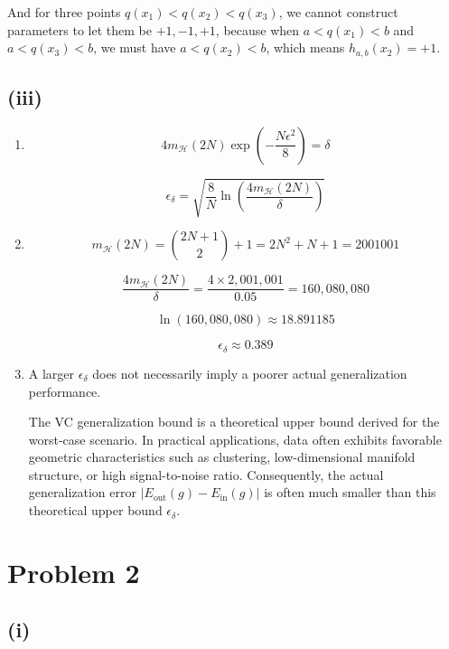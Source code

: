 \documentclass[11pt]{article}
\begin{document}
And for three points $q(x_1) < q(x_2) < q(x_3)$, we cannot construct parameters to let them be $+1, -1, +1$, because when $a < q(x_1) < b$ and $a < q(x_3) < b$, we must have $a < q(x_2) < b$, which means $h_{a,b}(x_2) = +1$.

\subsection*{(iii)}

\begin{enumerate}
    \item[1. ]
    
    $$
    4 m_\mathcal{H}(2N) \exp\left(-\frac{N\epsilon^2}{8}\right) = \delta
    $$

    $$
    \epsilon_\delta = \sqrt{\frac{8}{N} \ln\left(\frac{4 m_\mathcal{H}(2N)}{\delta}\right)}
    $$

    \item[2. ]
    
    $$
    m_\mathcal{H}(2N) = \binom{2N+1}{2} + 1 = 2N^2 + N + 1 = 2001001
    $$

    $$
    \frac{4 m_\mathcal{H}(2N)}{\delta} = \frac{4 \times 2,001,001}{0.05} = 160,080,080
    $$

    $$
    \ln(160,080,080) \approx 18.891185
    $$

    $$
    \epsilon_\delta \approx 0.389
    $$

    \item[3. ]
    
    A larger $\epsilon_\delta$ does not necessarily imply a poorer actual generalization performance.

    The VC generalization bound is a theoretical upper bound derived for the worst-case scenario. In practical applications, data often exhibits favorable geometric characteristics such as clustering, low-dimensional manifold structure, or high signal-to-noise ratio. Consequently, the actual generalization error $\vert E_{\text{out}}(g) - E_{\text{in}}(g) \vert$ is often much smaller than this theoretical upper bound $\epsilon_\delta$.
\end{enumerate}

\newpage

\section*{Problem 2}

\subsection*{(i)}
\end{document}
